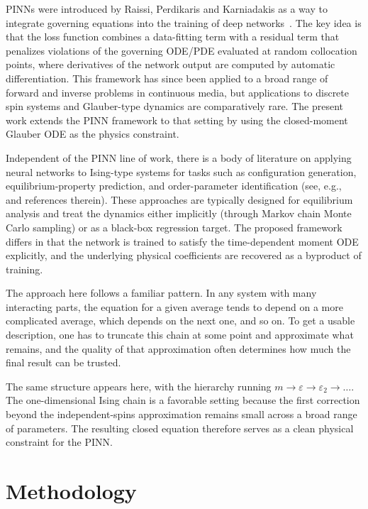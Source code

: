 \documentclass[conference]{IEEEtran}
\newcommand{\eps}{\varepsilon}
\newcommand{\epstwo}{\varepsilon_2}
\begin{document}
PINNs were introduced by Raissi, Perdikaris and Karniadakis as a way to
integrate governing equations into the training of deep
networks~\cite{raissi2019pinn}. The key idea is that the loss function
combines a data-fitting term with a residual term that penalizes
violations of the governing ODE/PDE evaluated at random collocation points,
where derivatives of the network output are computed by automatic
differentiation. This framework has since been applied to a broad range of
forward and inverse problems in continuous media, but applications to
discrete spin systems and Glauber-type dynamics are comparatively rare.
The present work extends the PINN framework to that setting by using the
closed-moment Glauber ODE as the physics constraint.


Independent of the PINN line of work, there is a body of literature on
applying neural networks to Ising-type systems for tasks such as
configuration generation, equilibrium-property prediction, and order-parameter
identification (see, e.g.,~\cite{carleo2017} and references therein).
These approaches are typically designed for equilibrium analysis and
treat the dynamics either implicitly (through Markov chain Monte Carlo
sampling) or as a black-box regression target. The proposed framework
differs in that the network is trained to satisfy the time-dependent
moment ODE explicitly, and the underlying physical coefficients are
recovered as a byproduct of training.

The approach here follows a familiar pattern. In any system with
many interacting parts, the equation for a given average tends to
depend on a more complicated average, which depends on the next
one, and so on. To get a usable description, one has to truncate
this chain at some point and approximate what remains, and the
quality of that approximation often determines how much the final
result can be trusted.

The same structure appears here, with the hierarchy running $m \to
\eps \to \epstwo \to \dots$. The one-dimensional Ising chain is a
favorable setting because the first correction beyond the
independent-spins approximation remains small across a broad range
of parameters. The resulting closed equation therefore serves as a
clean physical constraint for the PINN.

% 
\section{Methodology}
\label{sec:methodology}
\end{document}
